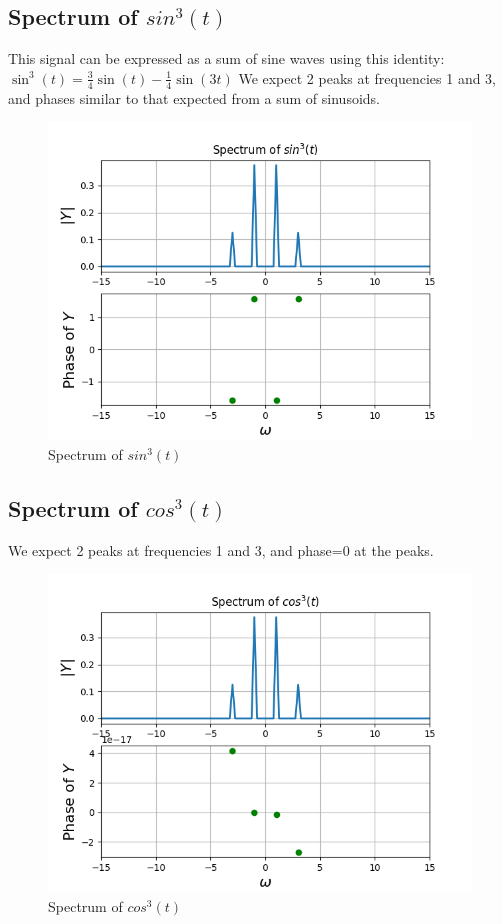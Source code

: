 \documentclass{article}
\begin{document}
\subsection{Spectrum of $sin^3(t)$}
This signal can be expressed as a sum of sine waves using this identity:\newline
$\sin^3(t) = \frac{3}{4}\sin(t) - \frac{1}{4}\sin(3t)$\newline
We expect 2 peaks at frequencies 1 and 3, and phases similar to that expected from a sum of sinusoids.
\begin{figure}[h!]
\centering
\includegraphics[scale=0.5]{Figure_5.png}
\caption{Spectrum of $sin^3(t)$}
\label{fig:universe}
\end{figure}

\subsection{Spectrum of $cos^3(t)$}
We expect 2 peaks at frequencies 1 and 3, and phase=0 at the peaks.
\begin{figure}[h!]
\centering
\includegraphics[scale=0.5]{Figure_6.png}
\caption{Spectrum of $cos^3(t)$}
\label{fig:universe}
\end{figure}
\clearpage
\end{document}
